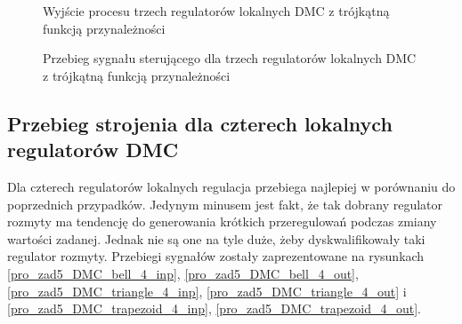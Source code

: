 \begin{figure}[t]
    \centering
    \caption{Wyjście procesu trzech regulatorów lokalnych DMC z trójkątną funkcją przynależności}
    \label{pro_zad5_DMC_triangle_3_out}
\end{figure}

\begin{figure}[b]
    \centering
    \caption{Przebieg sygnału sterującego dla trzech regulatorów lokalnych DMC z trójkątną  funkcją przynależności}
    \label{pro_zad5_DMC_triangle_3_inp}
\end{figure}
\FloatBarrier

\subsection{Przebieg strojenia dla czterech lokalnych regulatorów DMC}
Dla czterech regulatorów lokalnych regulacja przebiega najlepiej w porównaniu do poprzednich przypadków. Jedynym minusem jest fakt, że tak dobrany regulator rozmyty ma tendencję do generowania krótkich przeregulowań podczas zmiany wartości zadanej. Jednak nie są one na tyle duże, żeby dyskwalifikowały taki regulator rozmyty. Przebiegi sygnałów zostały zaprezentowane na rysunkach \ref{pro_zad5_DMC_bell_4_inp}, \ref{pro_zad5_DMC_bell_4_out}, \ref{pro_zad5_DMC_triangle_4_inp}, \ref{pro_zad5_DMC_triangle_4_out} i \ref{pro_zad5_DMC_trapezoid_4_inp}, \ref{pro_zad5_DMC_trapezoid_4_out}.  

